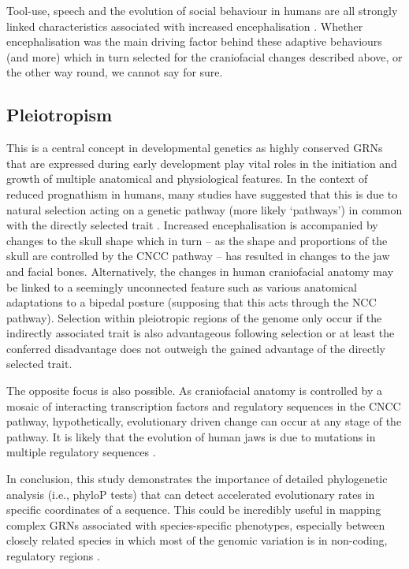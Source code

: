 \documentclass{article}[12pt]
\begin{document}
Tool-use, speech and the evolution of social behaviour in humans are all strongly linked characteristics associated with increased encephalisation \parencite{Martinez2009, Vallender2008}. Whether encephalisation was the main driving factor behind these adaptive behaviours (and more) which in turn selected for the craniofacial changes described above, or the other way round, we cannot say for sure.

\subsection*{Pleiotropism}

This is a central concept in developmental genetics as highly conserved \Glspl{GRN} that are expressed during early development play vital roles in the initiation and growth of multiple anatomical and physiological features. In the context of reduced prognathism in humans, many studies have suggested that this is due to natural selection acting on a genetic pathway (more likely ‘pathways’) in common with the directly selected trait \parencite{Osorio2015, Roosenboom2016}. Increased encephalisation is accompanied by changes to the skull shape which in turn – as the shape and proportions of the skull are controlled by the \Gls{CNCC} pathway – has resulted in changes to the jaw and facial bones. Alternatively, the changes in human craniofacial anatomy may be linked to a seemingly unconnected feature such as various anatomical adaptations to a bipedal posture (supposing that this acts through the \Gls{NCC} pathway). Selection within pleiotropic regions of the genome only occur if the indirectly associated trait is also advantageous following selection or at least the conferred disadvantage does not outweigh the gained advantage of the directly selected trait. \parencite{OBleness2012}

The opposite focus is also possible. As craniofacial anatomy is controlled by a mosaic of interacting transcription factors and regulatory sequences in the \Gls{CNCC} pathway, hypothetically, evolutionary driven change can occur at any stage of the pathway. It is likely that the evolution of human jaws is due to mutations in multiple regulatory sequences \parencite{Pollard2006}.

In conclusion, this study demonstrates the importance of detailed phylogenetic analysis (i.e., phyloP tests) that can detect accelerated evolutionary rates in specific coordinates of a sequence. This could be incredibly useful in mapping complex \Glspl{GRN} associated with species-specific phenotypes, especially between closely related species in which most of the genomic variation is in non-coding, regulatory regions \parencite{PhyloP}.
\end{document}
